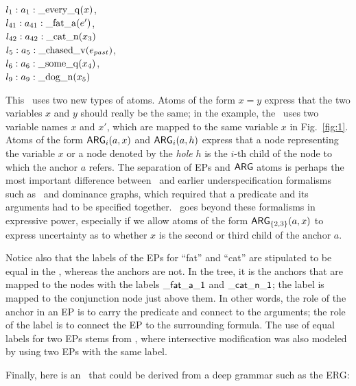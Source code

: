 \begin{examples}
\item 
$l_1:a_1:\mathrm{\_every\_q}(x)$, \\
$l_{41}:a_{41}:\mathrm{\_fat\_a}(e')$,\\
$l_{42}:a_{42}:\mathrm{\_cat\_n}(x_3)$\\
$l_5:a_5:\mathrm{\_chased\_v}(e_{past})$, \\
$l_6:a_6:\mathrm{\_some\_q}(x_4)$, \\
$l_9:a_9:\mathrm{\_dog\_n}(x_5)$
\label{ex:cat-partial-parser}
\end{examples}

This \rmrs\ uses two new types of atoms.  Atoms of the form $x=y$
express that the two variables $x$ and $y$ should really be the same;
in the example, the \rmrs\ uses two variable names $x$ and $x'$, which
are mapped to the same variable $x$ in Fig.~\ref{fig:1}.    Atoms of the form
$\mathsf{ARG}_i(a,x)$ and $\mathsf{ARG}_i(a,h)$ express that a node representing the
variable $x$ or a node denoted by the \emph{hole} $h$ is the $i$-th
child of the node to which the anchor $a$ refers.  The separation of
EPs and $\mathsf{ARG}$ atoms is perhaps the most important difference between
\rmrs\ and earlier underspecification formalisms such as \mrs\ and
dominance graphs, which required that a predicate and its arguments
had to be specified together.  \rmrs\ goes beyond these formalisms in
expressive power, especially if we allow atoms of the form
$\mathsf{ARG}_{\{2,3\}}(a,x)$ to express uncertainty as to whether $x$ is the
second or third child of the anchor $a$.

Notice also that the labels of the EPs for ``fat'' and ``cat'' are
stipulated to be equal in the \rmrs, whereas the anchors are not.
In the tree, it is the anchors that are mapped to the nodes with the
labels $\mathsf{\_fat\_a\_1}$ and $\mathsf{\_cat\_n\_1}$; the label is
mapped to the conjunction node just above them.  In other words, the
role of the anchor in an EP is to carry the predicate and connect to
the arguments; the role of the label is to connect the EP to the
surrounding formula.  The use of equal labels for two EPs stems from
\mrs, where intersective modification was also modeled by using two
EPs with the same label.

Finally, here is an \rmrs\ that could be derived from a deep grammar
such as the ERG:

